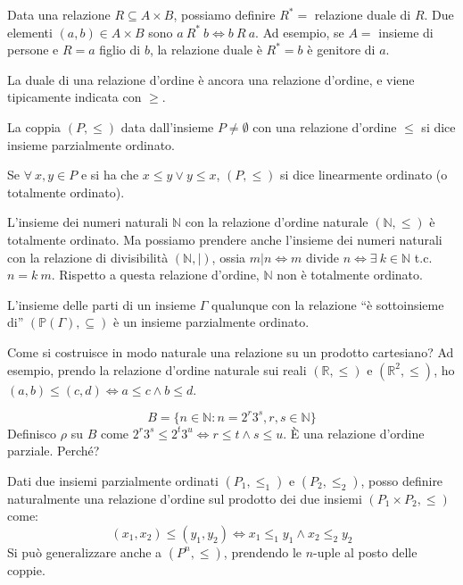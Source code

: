 Data una relazione $R \subseteq A \times B$, possiamo definire $R^{\ast} = $ relazione duale di $R$. Due elementi $(a,b) \in A \times B$ sono $a \ R^{\ast} \ b \Leftrightarrow b \ R \ a$. Ad esempio, se $A = $ insieme di persone e $R = a $ figlio di $b$, la relazione duale \`e $R^{\ast} = b $ \`e genitore di $a$.

La duale di una relazione d'ordine \`e ancora una relazione d'ordine, e viene tipicamente indicata con $\geq$.

La coppia $(P, \leq)$ data dall'insieme $P \neq \emptyset$ con una relazione d'ordine $\le$ si dice insieme parzialmente ordinato.

Se $\forall \ x, y \in P$ e si ha che $x \leq y \lor y \leq x$, $(P, \leq)$ si dice linearmente ordinato (o totalmente ordinato).

L'insieme dei numeri naturali $\mathbb{N}$ con la relazione d'ordine naturale $(\mathbb{N}, \leq)$ \`e totalmente ordinato. Ma possiamo prendere anche l'insieme dei numeri naturali con la relazione di divisibilit\`a $(\mathbb{N}, |)$, ossia $m | n \Leftrightarrow m \text{ divide } n \Leftrightarrow \exists \ k \in \mathbb{N}$ t.c. $n = k \ m$. Rispetto a questa relazione d'ordine, $\mathbb{N}$ non \`e totalmente ordinato.

L'insieme delle parti di un insieme $\Gamma$ qualunque con la relazione ``\`e sottoinsieme di'' $\left(\mathbb{P}(\Gamma), \subseteq \right)$ \`e un insieme parzialmente ordinato. 

Come si costruisce in modo naturale una relazione su un prodotto cartesiano? Ad esempio, prendo la relazione d'ordine naturale sui reali $(\mathbb{R}, \leq)$ e $(\mathbb{R}^2, \leq)$, ho $(a,b) \leq (c,d) \Leftrightarrow a \leq c \land b \leq d$.

\[
B = \{ n \in \mathbb{N} : n = 2^r 3^s, r, s \in \mathbb{N}\}
\]
Definisco $\rho$ su $B$ come $2^r 3^s \leq 2^t 3^u \Leftrightarrow r \leq t \land s \leq u$. \`E una relazione d'ordine parziale. Perch\'e?
\vspace{3cm}

\begin{defn}
Dati due insiemi parzialmente ordinati $(P_1, \le_1)$ e $(P_2, \le_2)$, posso definire naturalmente una relazione d'ordine sul prodotto dei due insiemi $(P_1 \times P_2, \le)$ come:
\[
(x_1, x_2) \le (y_1, y_2) \Leftrightarrow x_1 \le_1 y_1 \land x_2 \le_2 y_2
\]
Si pu\`o generalizzare anche a $(P^n, \le)$, prendendo le $n$-uple al posto delle coppie.
\end{defn}

